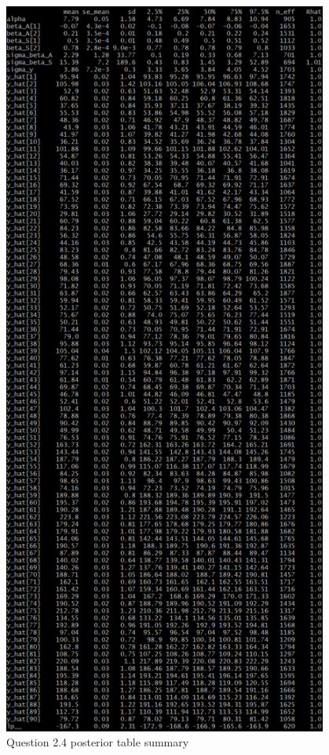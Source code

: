 \documentclass[11pt,a4paper,titlepage]{article}
\begin{document}
\begin{figure}[htb]
      \includegraphics[width=0.95\textwidth]{../q24/q24_table_summary.png}
      \caption{Question 2.4 posterior table summary}
    \label{tab:2.4}
  \end{figure}
\end{document}
